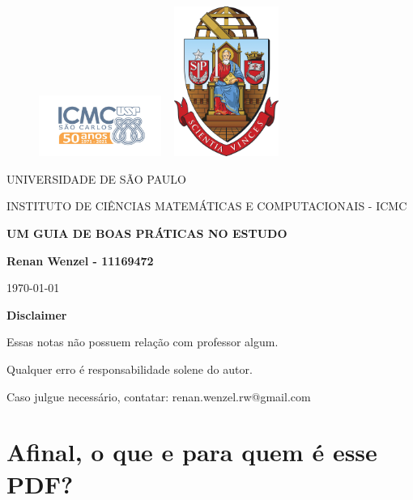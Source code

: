 \documentclass{article}
\begin{document}
 \begin{figure}[ht]
    \includegraphics[width=4cm]{../icmc.png}
    \hspace{7cm}
    \includegraphics[height=4.9cm,width=4cm]{../brasao_usp_cor.jpg}
  \endminipage  
\end{figure}

\begin{center}
  \vspace{1cm}
  \LARGE
  UNIVERSIDADE DE S\~AO PAULO

  \vspace{1.3cm}
  \LARGE
  INSTITUTO DE CI\^ENCIAS MATEM\'ATICAS E COMPUTACIONAIS - ICMC

  \vspace{1.7cm}
  \Large
  \textbf{UM GUIA DE BOAS PRÁTICAS NO ESTUDO}

  \vspace{1.3cm}
  \large
  \textbf{Renan Wenzel - 11169472}

  \vspace{6.3cm}
  \today
\end{center}

 \newpage
\textbf{{\Huge Disclaimer}}
 \vspace{5cm}

  {\huge Essas notas não possuem relação com professor algum. 

  Qualquer erro é responsabilidade solene do autor.

Caso julgue necessário, contatar: renan.wenzel.rw@gmail.com}
\newpage
\tableofcontents

\newpage
\section{Afinal, o que e para quem é esse PDF?}
\end{document}
